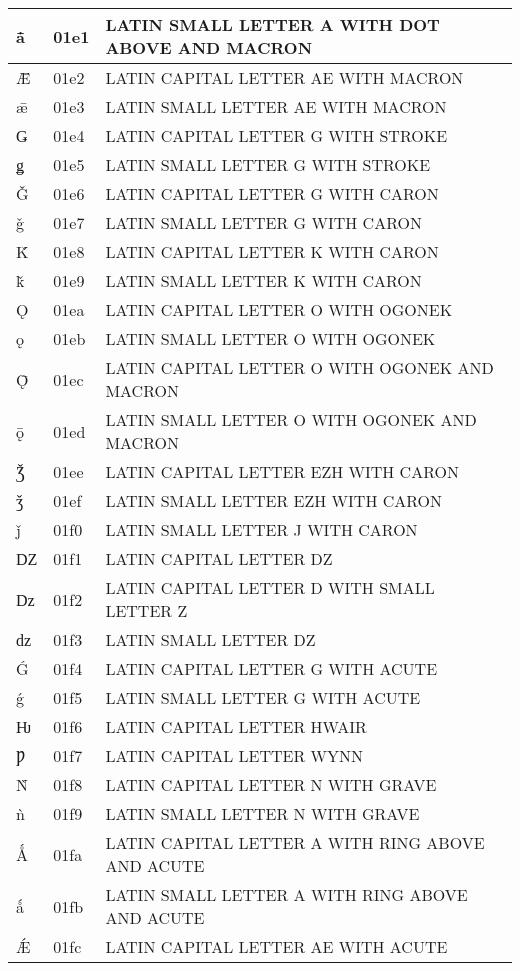 \documentclass[12pt,letterpaper,openany]{book}
\begin{document}
\begin{center}
\begin{supertabular}{|m{0.25in}|m{0.5in}|m{4in}|}
ǡ & 01e1 & LATIN SMALL LETTER A WITH DOT ABOVE AND MACRON\\\hline
Ǣ & 01e2 & LATIN CAPITAL LETTER AE WITH MACRON\\\hline
ǣ & 01e3 & LATIN SMALL LETTER AE WITH MACRON\\\hline
Ǥ & 01e4 & LATIN CAPITAL LETTER G WITH STROKE\\\hline
ǥ & 01e5 & LATIN SMALL LETTER G WITH STROKE\\\hline
Ǧ & 01e6 & LATIN CAPITAL LETTER G WITH CARON\\\hline
ǧ & 01e7 & LATIN SMALL LETTER G WITH CARON\\\hline
Ǩ & 01e8 & LATIN CAPITAL LETTER K WITH CARON\\\hline
ǩ & 01e9 & LATIN SMALL LETTER K WITH CARON\\\hline
Ǫ & 01ea & LATIN CAPITAL LETTER O WITH OGONEK\\\hline
ǫ & 01eb & LATIN SMALL LETTER O WITH OGONEK\\\hline
Ǭ & 01ec & LATIN CAPITAL LETTER O WITH OGONEK AND MACRON\\\hline
ǭ & 01ed & LATIN SMALL LETTER O WITH OGONEK AND MACRON\\\hline
Ǯ & 01ee & LATIN CAPITAL LETTER EZH WITH CARON\\\hline
ǯ & 01ef & LATIN SMALL LETTER EZH WITH CARON\\\hline
ǰ & 01f0 & LATIN SMALL LETTER J WITH CARON\\\hline
Ǳ & 01f1 & LATIN CAPITAL LETTER DZ\\\hline
ǲ & 01f2 & LATIN CAPITAL LETTER D WITH SMALL LETTER Z\\\hline
ǳ & 01f3 & LATIN SMALL LETTER DZ\\\hline
Ǵ & 01f4 & LATIN CAPITAL LETTER G WITH ACUTE\\\hline
ǵ & 01f5 & LATIN SMALL LETTER G WITH ACUTE\\\hline
Ƕ & 01f6 & LATIN CAPITAL LETTER HWAIR\\\hline
Ƿ & 01f7 & LATIN CAPITAL LETTER WYNN\\\hline
Ǹ & 01f8 & LATIN CAPITAL LETTER N WITH GRAVE\\\hline
ǹ & 01f9 & LATIN SMALL LETTER N WITH GRAVE\\\hline
Ǻ & 01fa & LATIN CAPITAL LETTER A WITH RING ABOVE AND ACUTE\\\hline
ǻ & 01fb & LATIN SMALL LETTER A WITH RING ABOVE AND ACUTE\\\hline
Ǽ & 01fc & LATIN CAPITAL LETTER AE WITH ACUTE\\\hline

\end{supertabular}
\end{center}
\end{document}
